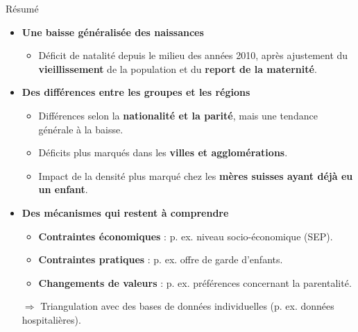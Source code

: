 \documentclass[aspectratio=169,9pt]{beamer}
\newcommand{\compresslist}{%
  \setlength{\itemsep}{2pt}%
  \setlength{\parskip}{0pt}%
  \setlength{\parsep}{0pt}%
}
\begin{document}
\begin{frame}{Résumé}
	
	\begin{itemize}\compresslist
		
		\item \textbf{Une baisse généralisée des naissances}
		\begin{itemize}\compresslist
			\item Déficit de natalité depuis le milieu des années 2010, après ajustement du  \textbf{vieillissement} de la population et du  \textbf{report de la maternité}.
		\end{itemize}
		\vspace{0.2cm}
		\item \textbf{Des différences entre les groupes et les régions}
		\begin{itemize}\compresslist
			\item Différences selon la \textbf{nationalité et la parité}, mais une tendance générale à la baisse.
			\item Déficits plus marqués dans les \textbf{villes et agglomérations}.
			\item Impact de la densité plus marqué chez les \textbf{mères suisses ayant déjà eu un enfant}.
		\end{itemize}
		\vspace{0.2cm}
		\item \textbf{Des mécanismes qui restent à comprendre}
		\begin{itemize}\compresslist
			\item \textbf{Contraintes économiques} : p. ex. niveau socio-économique (SEP).
			\item \textbf{Contraintes pratiques} : p. ex. offre de garde d'enfants.
			\item \textbf{Changements de valeurs} : p. ex. préférences concernant la parentalité.
		\end{itemize}
		$\Rightarrow$ Triangulation avec des bases de données individuelles (p. ex. données hospitalières).
	\end{itemize}
\end{frame}
\end{document}
